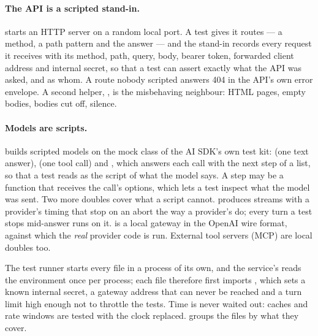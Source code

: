 \paragraph{The API is a scripted stand-in.}  starts an HTTP server
on a random local port. A test gives it routes --- a method, a path pattern and the answer ---
and the stand-in records every request it receives with its method, path, query, body, bearer
token, forwarded client address and internal secret, so that a test can assert exactly what
the API was asked, and as whom. A route nobody scripted answers 404 in the API's own error
envelope. A second helper, , is the misbehaving neighbour:
HTML pages, empty bodies, bodies cut off, silence.

\paragraph{Models are scripts.}  builds scripted models on the mock
class of the AI SDK's own test kit:  (one text answer), 
(one tool call) and , which answers each call with the next step of a list, so
that a test reads as the script of what the model says. A step may be a function that receives
the call's options, which lets a test inspect what the model was sent. Two more doubles cover
what a script cannot.  produces streams with a provider's
timing that stop on an abort the way a provider's do; every turn a test stops mid-answer runs
on it.  is a local gateway in the OpenAI wire format,
against which the \emph{real} provider code is run. External tool servers (MCP) are local
doubles too.

The test runner starts every file in a process of its own, and the service's 
reads the environment once per process; each file therefore first imports
, which sets a known internal secret, a gateway address that can never be
reached and a turn limit high enough not to throttle the tests. Time is never waited out:
caches and rate windows are tested with the clock replaced. 
groups the files by what they cover.

